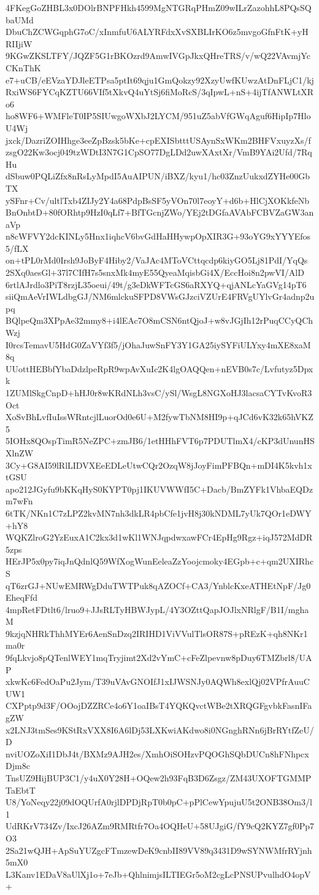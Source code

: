 4FKegGoZHBL3x0DOlrBNPFHkh4599MgNTGRqPHmZ09wILrZazohhL8PQsSQbaUMd
DbuChZCWGqphG7oC/xInmfuU6ALYRFdxXvSXBLIrKO6z5mvgoGfnFtK+yHRIIjiW
9KGwZKSLTFY/JQZF5G1rBKOzrd9AmwIVGpJkxQHreTRS/v/wQ22VAvmjYcCKnThK
e7+uCB/eEVzaYDJleETPsa5ptIt69qju1GmQokzy92XzyUwfKUwzAtDnFLjC1/kj
RxiWS6FYCqKZTU66VIf5tXkvQ4uYtSj6fiMoRcS/3qIpwL+nS+4ijTfANWLtXRo6
ho8WF6+WMFleT0IP5SIUwgoWXbJ2LYCM/951uZ5abVfGWqAguf6HipIp7HloU4Wj
jxck/DazriZOIHhge3eeZpBzsk5bKe+cpEXISbtttUSAynSxWKm2BHFVxuyzXs/f
zsgO22Kw3ocj049tzWDtI3N7G1CpSO77DgLDd2uwXAxtXr/VmB9YAi2Ufd/7RqHu
dSbuw0PQLiZfx8nRsLyMpdI5AuAIPUN/iBXZ/kyu1/hc03ZnzUukxdZYHe00GbTX
ySFnr+Cv/ultlTxb4ZIJy2Y4a68PdpBsSF5yVOn70l7eoyY+d6b+HlCjXOKkfeNb
BnOnbtD+80fORhtp9HzI0qLf7+BfTGcnjZWo/YEj2tDGfaAVAbFCBVZaGW3anaVp
n8cWFVY2dcKINLy5Hnx1iqhcV6bvGdHaHHywpOpXIR3G+93oYG9xYYYEfos5/fLX
on+tPL0rMd0Irsh9JoByF4Hiby2/VaJAc4MToVCttqcdp6kiyGO5Lj81PdI/YqQs
2SXq0aesGl+37l7CIfH7s5snxMk4myE55QyeaMqisbGi4X/EccHoi8n2pwVI/AlD
6rtlAJrdlo3PiT8rzjL35oeui/49t/g3eDkWFTcGS6aRXYQ+qjANLcYaGVg14pT6
siiQmAeVrIWLdbgGJ/NM6mlckuSFPD8VWsGJzciVZUrE4FRVgUYlvGr4adnp2upq
BQlpeQm3XPpAe32mmy8+i4lEAc7O8mCSN6ntQjoJ+w8vJGjIh12rPuqCCyQChWzj
I0rcsTemavU5HdG0ZaVYf3f5/jOhaJuwSnFY3Y1GA25iySYFiULYxy4mXE8xaM8q
UUottHEBbfYbaDdzlpeRpR9wpAvXuIc2K4lgOAQQen+nEVB0s7c/Lvfutyz5Dpxk
1ZUMlSkgCnpD+hHJ0r8wKRdNLh3vsC/ySl/WsgL8NGXoHJ3lacsaCYTvKvoR3Oct
XoSvBhLvfIuIssWRntcjlLuorOd0e6U+M2fywTbNM8HI9p+qJCd6vK32k65hVKZ5
5IOHx8QOspTimR5NeZPC+zmJB6/1etHHhFVT6p7PDUTlmX4/cKP3dUnunHSXlnZW
3Cy+G8AI59lRlLIDVXEeEDLeUtwCQr2OzqW8jJoyFimPFBQn+mDI4K5kvh1xtGSU
apo212JGyfu9bKKqHyS0KYPT0pj1IKUVWWfI5C+Dacb/BmZYFk1VhbaEQDzm7wFn
6tTK/NKn1C7zLPZ2kvMN7nh3dkLR4pbCfe1jvH8j30kNDML7yUk7QOr1eDWY+hY8
WQKZlroG2YzEuxA1C2kx3d1wKl1WNJqpdwxawFCr4EpHg9Rgz+iqJ572MdDR5zps
HErJP5x0py7iqJnQdnlQ59WfXogWunEeleaZzYoojcmoky4EGpb+c+qm2UXIRhcS
qT6zrGJ+NUwEMRWgDduTWTPuk8qAZOCf+CA3/YnblcKxeATHEtNpF/Jg0EheqFfd
4mpRetFDtlt6/lruo9+JJsRLTyHBWJypL/4Y3OZttQapJOJlxNRlgF/B1I/mghaM
9kzjqNHRkThhMYEr6AenSnDzq2IRIHD1ViVVulTlsOR87S+pREzK+qh8NKr1ma0r
9fqLkvjo8pQTenlWEY1mqTryjimt2Xd2vYmC+cFeZlpevnw8pDuy6TMZbrl8/UAP
xkwKc6FedOaPu2Jym/T39uVAvGNOIfJ1xIJWSNJy0AQWh8exlQj02VPfrAuuCUW1
CXPptp9d3F/OOojDZZRCe4o6Y1oaIBsT4YQKQvctWBe2tXRQGFgvbkFasnIFagZW
x2LNJ3tmSes9KStRxVXX8I6A6lDj53LXKwiAKdwo8i0NGnghRNn6jBrRYtfZeU/D
nviUOZoXiI1DbJ4t/BXMz9AJH2es/XmhOiSOHzvPQOGhSQbDUCn8hFNhpcxDjm8c
TnsUZ9HijBUP3C1/y4uX0Y28H+OQew2h93FqB3D6Zsgz/ZM43UXOFTGMMPTaEbtT
U8/YoNeqy22j09dOQUrfA0rjlDPDjRpT0b0pC+pPlCewYpujuU5t2ONB38Om3/l1
UdRKrV734Zv/IxcJ26AZm9RMRtfr7Oa4OQHeU+58UJgiG/fY9cQ2KYZ7gf0Pp7O3
2Sa21wQJH+ApSuYUZgcFTmzewDeK9cnbII89VV89q3431D9wSYNWMfrRYjnh5mX0
L3Kanv1EDaV8aUlXj1o+7eJb+QhlnimjsILTIEGr5oM2cgLcPNSUPvulhdO4opV+
